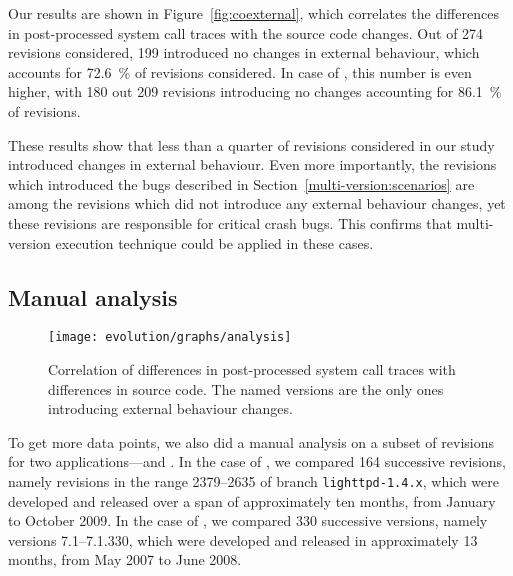Our results are shown in Figure~\ref{fig:coexternal}, which correlates the
differences in post-processed system call traces with the source code changes.
Out of 274 \lighttpd revisions considered, 199 introduced no changes in
external behaviour, which accounts for \SI{72.6}{\percent} of revisions considered. In case
of \lighttpdtwo, this number is even higher, with 180 out 209 revisions
introducing no changes accounting for \SI{86.1}{\percent} of revisions.

These results show that less than a quarter of revisions considered in our
study introduced changes in external behaviour. Even more importantly, the
revisions which introduced the bugs described in
Section~\ref{multi-version:scenarios} are among the revisions which did not
introduce any external behaviour changes, yet these revisions are responsible
for critical crash bugs. This confirms that multi-version execution technique
could be applied in these cases.


\subsection{Manual analysis}

\begin{figure}[t]
  \begin{center}
    \texttt{[image: evolution/graphs/analysis]}
    \caption{Correlation of differences in post-processed system call traces
      with differences in source code. The named versions are the only ones
      introducing external behaviour changes.}
    \label{fig:coanalysis}
  \end{center}
\end{figure}

To get more data points, we also did a manual analysis on a subset of revisions
for two applications---\lighttpd and \vim. In the case of \lighttpd, we
compared 164 successive revisions, namely revisions in the range 2379--2635 of
branch \texttt{lighttpd-1.4.x}, which were developed and released over a span
of approximately ten months, from January to October 2009. In the case of \vim,
we compared 330 successive versions, namely versions 7.1--7.1.330, which were
developed and released in approximately 13 months, from May 2007 to June 2008.


